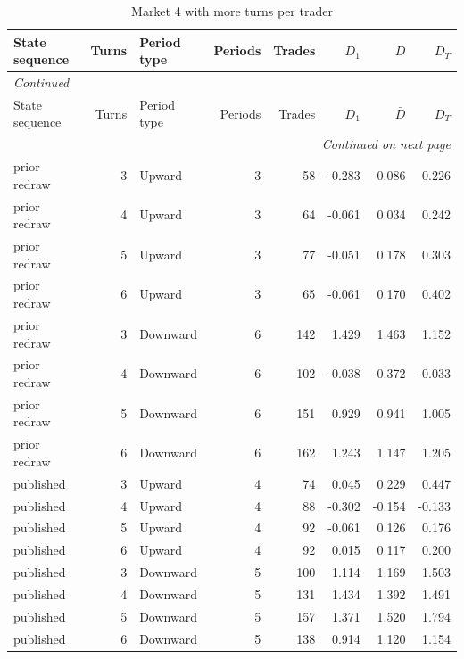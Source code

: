 \scriptsize
\begin{longtable}{lrlrrrrr}
\caption{Market 4 with more turns per trader}\label{tab:app-rounds}\\
\toprule
State sequence & Turns & Period type & Periods & Trades & $D_1$ & $\bar D$ & $D_T$ \\
\midrule
\endfirsthead
\multicolumn{8}{l}{\textit{Continued}}\\
\toprule
State sequence & Turns & Period type & Periods & Trades & $D_1$ & $\bar D$ & $D_T$ \\
\midrule
\endhead
\midrule
\multicolumn{8}{r}{\textit{Continued on next page}}\\
\endfoot
\bottomrule
\endlastfoot
prior redraw & 3 & Upward & 3 & 58 & -0.283 & -0.086 & 0.226 \\
prior redraw & 4 & Upward & 3 & 64 & -0.061 & 0.034 & 0.242 \\
prior redraw & 5 & Upward & 3 & 77 & -0.051 & 0.178 & 0.303 \\
prior redraw & 6 & Upward & 3 & 65 & -0.061 & 0.170 & 0.402 \\
prior redraw & 3 & Downward & 6 & 142 & 1.429 & 1.463 & 1.152 \\
prior redraw & 4 & Downward & 6 & 102 & -0.038 & -0.372 & -0.033 \\
prior redraw & 5 & Downward & 6 & 151 & 0.929 & 0.941 & 1.005 \\
prior redraw & 6 & Downward & 6 & 162 & 1.243 & 1.147 & 1.205 \\
published & 3 & Upward & 4 & 74 & 0.045 & 0.229 & 0.447 \\
published & 4 & Upward & 4 & 88 & -0.302 & -0.154 & -0.133 \\
published & 5 & Upward & 4 & 92 & -0.061 & 0.126 & 0.176 \\
published & 6 & Upward & 4 & 92 & 0.015 & 0.117 & 0.200 \\
published & 3 & Downward & 5 & 100 & 1.114 & 1.169 & 1.503 \\
published & 4 & Downward & 5 & 131 & 1.434 & 1.392 & 1.491 \\
published & 5 & Downward & 5 & 157 & 1.371 & 1.520 & 1.794 \\
published & 6 & Downward & 5 & 138 & 0.914 & 1.120 & 1.154 \\
\end{longtable}
